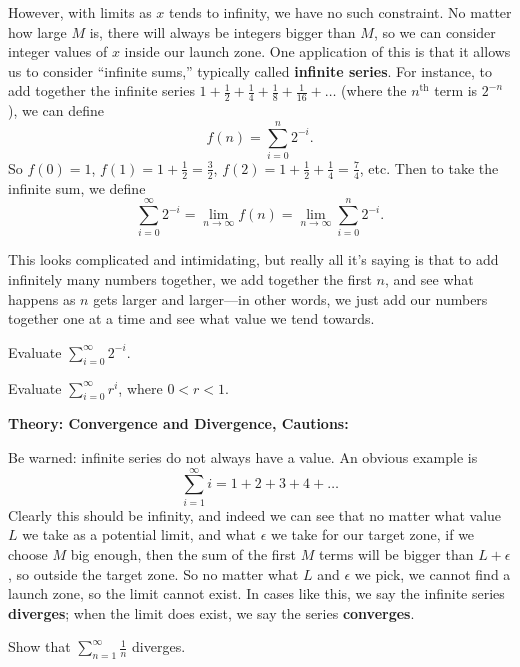 \documentclass{article}
\begin{document}
However, with limits as $x$ tends to infinity, we have no such constraint. No matter how large $M$ is, there will always be integers bigger than $M$, so we can consider integer values of $x$ inside our launch zone. One application of this is that it allows us to consider ``infinite sums,'' typically called \textbf{infinite series}. For instance, to add together the infinite series $1+\frac{1}{2}+\frac{1}{4}+\frac{1}{8}+\frac{1}{16}+\hdots$ (where the $n^{\mathrm{th}}$ term is $2^{-n}$), we can define
\[f(n)=\sum_{i=0}^n 2^{-i}.\]
So $f(0)=1$, $f(1)=1+\frac{1}{2}=\frac{3}{2}$, $f(2)=1+\frac{1}{2}+\frac{1}{4}=\frac{7}{4}$, etc. Then to take the infinite sum, we define
\[\sum_{i=0}^\infty 2^{-i}=\lim_{n\to\infty}f(n)=\lim_{n\to\infty}\sum_{i=0}^n2^{-i}.\]

This looks complicated and intimidating, but really all it's saying is that to add infinitely many numbers together, we add together the first $n$, and see what happens as $n$ gets larger and larger---in other words, we just add our numbers together one at a time and see what value we tend towards.\bigskip

Evaluate $\sum\limits_{i=0}^\infty 2^{-i}$.


\vfill


Evaluate $\sum\limits_{i=0}^\infty r^i$, where $0<r<1$.

\vfill

\clearpage







\textbf{Theory: Convergence and Divergence, Cautions:}

\vspace{5mm}



Be warned: infinite series do not always have a value. An obvious example is
\[\sum_{i=1}^\infty i=1+2+3+4+\hdots\]
Clearly this should be infinity, and indeed we can see that no matter what value $L$ we take as a potential limit, and what $\epsilon$ we take for our target zone, if we choose $M$ big enough, then the sum of the first $M$ terms will be bigger than $L+\epsilon$, so outside the target zone. So no matter what $L$ and $\epsilon$ we pick, we cannot find a launch zone, so the limit cannot exist. In cases like this, we say the infinite series \textbf{diverges}; when the limit does exist, we say the series \textbf{converges}.\bigskip

Show that $\sum\limits_{n=1}^\infty \frac{1}{n}$ diverges.
\end{document}
